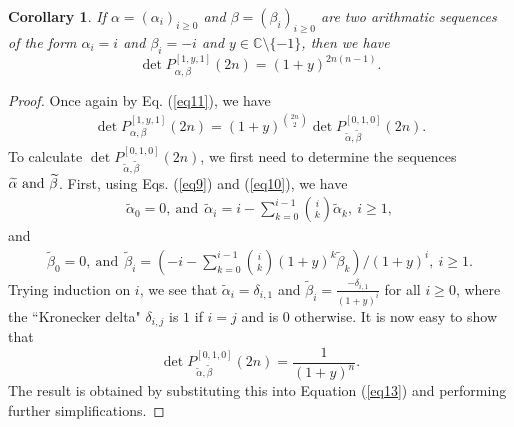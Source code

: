 \documentclass{amsart}
\newtheorem{corollary}{Corollary}
\begin{document}
\begin{corollary}\cite[Theorem 3]{K2}\label{cor4} If $\alpha=(\alpha_i)_{i\geq 0}$ and $\beta=(\beta_i)_{i\geq 0}$ are two arithmatic sequences of the form $\alpha_i=i$ and $\beta_i=-i$ and $y\in \mathbb{C}\setminus \{-1\}$, then we have
\[
\det P_{\alpha,\beta}^{[1, y, 1]}(2n)=(1+y)^{2n(n-1)}.
\]
\end{corollary} 
\begin{proof} Once again by Eq. (\ref{eq11}), we have 
 \begin{align}\label{eq13} \det P_{\alpha,\beta}^{[1, y, 1]}(2n)=(1+y)^{\binom{2n}{2}} \det P_{\widetilde{\alpha}, \widetilde{\beta}}^{[0,1,0]}(2n).
 \end{align}
 To calculate $\det P_{\widetilde{\alpha}, \widetilde{\beta}}^{[0,1,0]}(2n)$, we first need to determine the sequences $\widetilde{\alpha}\) and \(\widetilde{\beta}$. First, using Eqs. (\ref{eq9}) and (\ref{eq10}), we have 
\begin{align*} \widetilde{\alpha}_{0}=0, \ \text{and} \ \  \widetilde{\alpha}_{i}=i-\sum_{k=0}^{i-1}\binom{i}{k} \widetilde{\alpha}_k, \   i\geq 1,
\end{align*}
and 
 \begin{align*} \widetilde{\beta}_{0}=0, \  \text{and} \ \  \widetilde{\beta}_{i}=\left(-i-\sum_{k=0}^{i-1} \binom{i}{k}(1+y)^k \widetilde{\beta}_k\right)/(1+y)^i, \  i\geq 1.\end{align*}
 Trying induction on $i$, we see that $\widetilde{\alpha}_{i}=\delta_{i, 1}$ and $ \widetilde{\beta}_i=\frac{-\delta_{i, 1}}{(1+y)^i}$ for all $i\geq 0$, where the ``Kronecker delta" $\delta_{i, j}$ is $1$ if $i=j$ and is $0$ otherwise. It is now easy to show that
$$\det P_{\widetilde{\alpha}, \widetilde{\beta}}^{[0,1,0]}(2n)=\frac{1}{(1+y)^n}.$$
The result is obtained by substituting this into Equation (\ref{eq13}) and performing further simplifications.
\end{proof}
 
 
\end{document}
